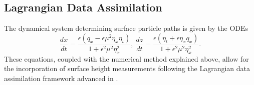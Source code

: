 

\subsection*{Lagrangian Data Assimilation}
The dynamical system determining surface particle paths is given by the ODEs
\[
\frac{dx}{dt} = \frac{\epsilon\left(q_{x}-\epsilon\mu^{2}\eta_{x}\eta_{t}\right)}{1 + \epsilon^{2}\mu^{2}\eta_{x}^{2}}, ~ \frac{dz}{dt} = \frac{\epsilon\left(\eta_{t}+\epsilon \eta_{x} q_{x}\right)}{1 + \epsilon^{2}\mu^{2}\eta_{x}^{2}}. 
\]
These equations, coupled with the numerical method explained above, allow for the incorporation of surface height measurements following the Lagrangian data assimilation framework advanced in \cite{jones1,jones2}.  

